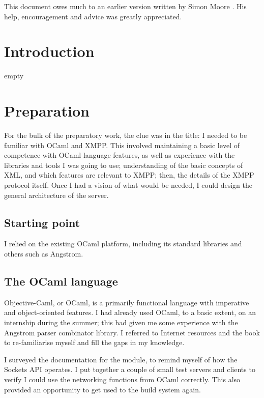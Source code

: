 \documentclass[12pt,a4paper,twoside,openright]{report}
\begin{document}
{This document owes much to an earlier version written by Simon Moore
\cite{Moore95}.  His help, encouragement and advice was greatly
appreciated.


\pagestyle{headings}

\chapter{Introduction}
empty

\chapter{Preparation}
For the bulk of the preparatory work, the clue was in the title: I needed to be familiar with OCaml and XMPP. This involved maintaining a basic level of competence with OCaml language features, as well as experience with the libraries and tools I was going to use; understanding of the basic concepts of XML, and which features are relevant to XMPP; then, the details of the XMPP protocol itself. Once I had a vision of what would be needed, I could design the general architecture of the server.

\section{Starting point}
I relied on the existing OCaml platform, including its standard libraries and others such as Angstrom.

\section{The OCaml language}
Objective-Caml, or OCaml, is a primarily functional language with imperative and object-oriented features. I had already used OCaml, to a basic extent, on an internship during the summer; this had given me some experience with the Angstrom parser combinator library. I referred to Internet resources and the  book to re-familiarise myself and fill the gaps in my knowledge.

I surveyed the documentation for the  module, to remind myself of how the Sockets API operates. I put together a couple of small test servers and clients to verify I could use the networking functions from OCaml correctly. This also provided an opportunity to get used to the build system again.

}
\end{document}
